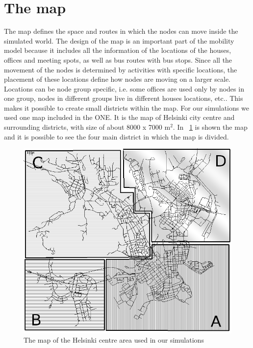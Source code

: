 \section{The map}
\label{mappaONE}
The map defines the space and routes in which the nodes can move inside the simulated world. The design of the map is an important part of the mobility model because it includes all the information of the locations of the houses, offices and meeting spots, as well as bus routes with bus stops. Since all the movement of the nodes is determined by activities with specific locations, the placement of these locations define how nodes are moving on a larger scale. Locations can be node group specific, i.e. some offices are used only by nodes in one group, nodes in different groups live in different houses locations, etc.. This makes it possible to create small districts within the map. For our simulations we used one map included in the ONE. It is the map of Helsinki city centre and surrounding districts, with size of about 8000 x 7000 m$^{2}$. In \figurename~\ref{imgMappaABCD} is shown the map and it is possible to see the four main district in which the map is divided. 

\begin{figure}[htpb]
  \begin{center}
    \includegraphics[scale=0.5]{figure/mappa_ABCD.png}
    \caption[Helsinky map]{The map of the Helsinki centre area used in our simulations}    
    \label{imgMappaABCD}
  \end{center}
\end{figure}


